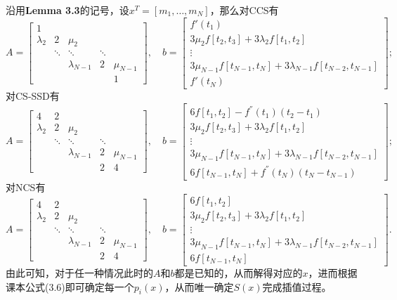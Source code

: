 \documentclass{ctexart}
\begin{document}
\begin{sloppypar}
沿用\textbf{Lemma 3.3}的记号，设$x^T = [m_{1},\dots,m_N]$，那么对CCS有
$$
A = 
\begin{bmatrix}
    1 & & & & \\
    \lambda_2 & 2 & \mu_2 & &\\
    & \ddots & \ddots & \ddots &\\
    & & \lambda_{N-1} & 2 & \mu_{N-1} \\
    & & & & 1
\end{bmatrix}
, \quad b = 
\begin{bmatrix}
    f'(t_1) \\
    3\mu_2f[t_2,t_3]+3\lambda_2f[t_1,t_2] \\
    \vdots \\
    3\mu_{N-1}f[t_{N-1},t_{N}]+3\lambda_{N-1}f[t_{N-2},t_{N-1}] \\
    f'(t_N) 
\end{bmatrix}
;
$$
对CS-SSD有
$$
A = 
\begin{bmatrix}
    4 & 2 & & & \\
    \lambda_2 & 2 & \mu_2 & &\\
    & \ddots & \ddots & \ddots &\\
    & & \lambda_{N-1} & 2 & \mu_{N-1} \\
    & & & 2 & 4
\end{bmatrix}
, \quad b = 
\begin{bmatrix}
    6f[t_1,t_2] - f^{''}(t_1)(t_2-t_1)\\
    3\mu_2f[t_2,t_3]+3\lambda_2f[t_1,t_2] \\
    \vdots \\
    3\mu_{N-1}f[t_{N-1},t_{N}]+3\lambda_{N-1}f[t_{N-2},t_{N-1}] \\
    6f[t_{N-1},t_{N}] + f^{''}(t_N)(t_N-t_{N-1}) 
\end{bmatrix}
;
$$
对NCS有
$$
A = 
\begin{bmatrix}
    4 & 2 & & & \\
    \lambda_2 & 2 & \mu_2 & &\\
    & \ddots & \ddots & \ddots &\\
    & & \lambda_{N-1} & 2 & \mu_{N-1} \\
    & & & 2 & 4
\end{bmatrix}
, \quad b = 
\begin{bmatrix}
    6f[t_1,t_2]\\
    3\mu_2f[t_2,t_3]+3\lambda_2f[t_1,t_2] \\
    \vdots \\
    3\mu_{N-1}f[t_{N-1},t_{N}]+3\lambda_{N-1}f[t_{N-2},t_{N-1}] \\
    6f[t_{N-1},t_{N}]
\end{bmatrix}
.
$$
由此可知，对于任一种情况此时的$A$和$b$都是已知的，从而解得对应的$x$，进而根据课本公式(3.6)即可确定每一个$p_i(x)$，从而唯一确定$S(x)$完成插值过程。


\end{sloppypar}
\end{document}

